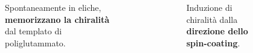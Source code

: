 \begin{frame}
\begin{columns}
\begin{columns}
\begin{figure}{}\end{figure}
Spontaneamente in eliche, \textbf{memorizzano la chiralità} dal templato di poliglutammato.\end{columns}
\begin{columns}
\begin{figure}{}\end{figure}
Induzione di chiralità dalla \textbf{direzione dello spin-coating}.
\end{columns}\end{columns}
\end{frame}
